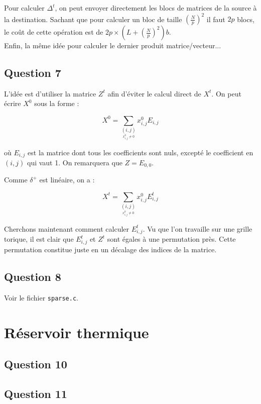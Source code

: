 \documentclass{article}
\begin{document}
Pour calculer $\Delta^t$, on peut envoyer directement les blocs de matrices de la source à la destination. Sachant que pour calculer un bloc de taille ${\left( \frac{N}{p} \right)}^2$ il faut $2p$ blocs, le coût de cette opération est de $2p \times \left( L + {\left( \frac{N}{p} \right)}^2 \right) b$. \\

Enfin, la même idée pour calculer le dernier produit matrice/vecteur... %

\subsection*{Question 7}

L'idée est d'utiliser la matrice $Z^t$ afin d'éviter le calcul direct de $X^t$. On peut écrire $X^0$ sous la forme : 

$$ X^0 = \sum_{\underset{x^0_{i,j} \neq 0}{(i,j)}} x^0_{i,j}E_{i,j} $$

où $E_{i,j}$ est la matrice dont tous les coefficients sont nuls, excepté le coefficient en $(i,j)$ qui vaut 1. On remarquera que $Z = E_{0,0}$.

Comme $\delta^+$ est linéaire, on a :

$$ X^t = \sum_{\underset{x^0_{i,j} \neq 0}{(i,j)}} x^0_{i,j}E_{i,j}^t $$

Cherchons maintenant comment calculer $E_{i,j}^t$. Vu que l'on travaille sur une grille torique, il est clair que $E_{i,j}^t$ et $Z^t$ sont égales à une permutation près. Cette permutation constitue juste en un décalage des indices de la matrice. 


\subsection*{Question 8}

Voir le fichier \texttt{sparse.c}.

\section{Réservoir thermique}

\subsection*{Question 10}

\subsection*{Question 11}
\end{document}
